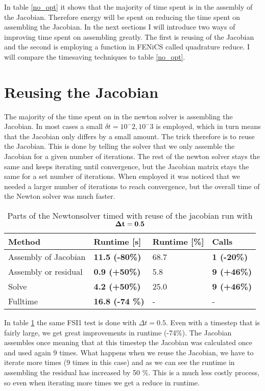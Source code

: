 In table \ref{no_opt} it shows that the majority of time spent is in the assembly of the Jacobian. Therefore energy will be spent on reducing the time spent on assembling the Jacobian. In the next sections I will introduce two ways of improving time spent on assembling greatly. The first is reusing of the Jacobian and the second is employing a function in FENiCS called quadrature reduce. I will compare the timesaving techniques to table \ref{no_opt}.

\section{Reusing the Jacobian}
The majority of the time spent on in the newton solver is assembling the Jacobian. In most cases a small $\delta t = 10^-2, 10^-3$ is employed, which in turn means that the Jacobian only differs by a small amount. The trick therefore is to reuse the Jacobian. This is done by telling the solver that we only assemble the Jacobian for a given number of iterations. The rest of the newton solver stays the same and keeps iterating until convergence, but the Jacobian matrix stays the same for a set number of iterations. When employed it was noticed that we needed a larger number of iterations to reach convergence, but the overall time of the Newton solver was much faster.\newline

\begin{table}[H]
\centering
\caption{Parts of the Newtonsolver timed with reuse of the jacobian run with $\bold{\Delta t = 0.5}$}
\label{jac_reuse}
\begin{tabular}{|l|l|l|l|}
\hline
Method & \textbf{Runtime {[}s{]}} & Runtime {[}\%{]} & \textbf{Calls} \\ \hline
Assembly of Jacobian & \textbf{11.5 (-80\%)} & 68.7 & \textbf{1 (-20\%)} \\ \hline
Assembly or residual & \textbf{0.9 (+50\%)} & 5.8 & \textbf{9 (+46\%)} \\ \hline
Solve & \textbf{4.2 (+50\%)} & 25.0 & \textbf{9 (+46\%)} \\ \hline
Fulltime & \textbf{16.8 (-74 \%)} & - & - \\ \hline
\end{tabular}
\end{table}

In table \ref{jac_reuse} the same FSI1 test is done with $\Delta t = 0.5$. Even with a timestep that is fairly large, we get great improvements in runtime (-74\%). The Jacobian assembles once meaning that at this timestep the Jacobian was calculated once and used again 9 times. What happens when we reuse the Jacobian, we have to iterate more times (9 times in this case) and as we can see the runtime in assembling the residual has increased by 50 \%. This is a much less costly process, so even when iterating more times we get a reduce in runtime.


